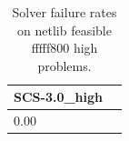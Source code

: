 \begin{table}
\caption{Solver failure rates on netlib feasible fffff800 high problems.}
\label{t-netlib feasible fffff800 high-failure}
\begin{tabular}{lc}
\toprule
SCS-3.0_high \\
\midrule
0.00 \\
\bottomrule
\end{tabular}
\end{table}
